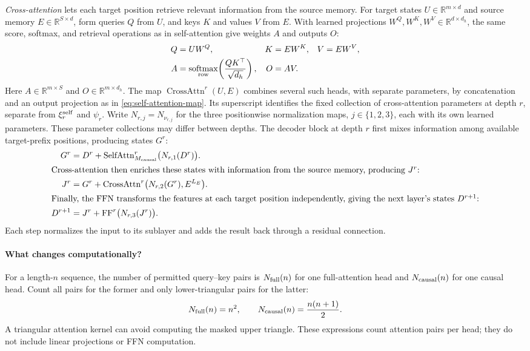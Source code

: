 \documentclass[11pt,twoside]{article}
\DeclareMathOperator{\softmax}{softmax}
\newcommand{\R}{\mathbb R}
\theoremstyle{plain}
\theoremstyle{definition}
\theoremstyle{remark}
\begin{document}
\emph{Cross-attention} lets each target position retrieve relevant information
from the source memory. For target states $U\in\R^{m\times d}$ and source
memory $E\in\R^{S\times d}$, form queries $Q$ from $U$, and keys $K$ and
values $V$ from $E$. With learned projections
$W^Q,W^K,W^V\in\R^{d\times d_h}$, the same score, softmax, and retrieval
operations as in self-attention give weights $A$ and outputs $O$:
\begin{equation}
\begin{aligned}
Q&=UW^Q,
&K&=EW^K,
&V&=EW^V,\\
A&=\softmax_{\rm row}\!\left(\frac{QK^\top}{\sqrt{d_h}}\right),
&O&=AV.
\end{aligned}
\label{eq:cross-attention-head}
\end{equation}
Here $A\in\R^{m\times S}$ and $O\in\R^{m\times d_h}$.
The map $\operatorname{CrossAttn}^r(U,E)$ combines several such heads,
with separate parameters, by concatenation and an output projection as in
\eqref{eq:self-attention-map}. Its superscript identifies the fixed collection
of cross-attention parameters at depth $r$, separate from $\xi^{\rm self}_r$
and $\psi_r$. Write $N_{r,j}=N_{\nu_{r,j}}$ for the three positionwise
normalization maps, $j\in\{1,2,3\}$, each with its own learned parameters.
These parameter collections may differ between depths.
The decoder block at depth $r$ first mixes information among available
target-prefix positions, producing states $G^r$:
\begin{align}
G^r
&=D^r+\operatorname{SelfAttn}^r_{M_{\rm causal}}
  \bigl(N_{r,1}(D^r)\bigr).
\nonumber\\
\intertext{Cross-attention then enriches these states with information from
the source memory, producing $J^r$:}
J^r
&=G^r+\operatorname{CrossAttn}^r
  \bigl(N_{r,2}(G^r),E^{L_E}\bigr).
\nonumber\\
\intertext{Finally, the FFN transforms the features at each target position
independently, giving the next layer's states $D^{r+1}$:}
D^{r+1}
&=J^r+\operatorname{FF}^r
  \bigl(N_{r,3}(J^r)\bigr).
\label{eq:encoder-decoder-block}
\end{align}
Each step normalizes the input to its sublayer and adds the result back
through a residual connection.

\paragraph{What changes computationally?}
For a length-$n$ sequence, the number of permitted query--key pairs is
$N_{\rm full}(n)$ for one full-attention head and $N_{\rm causal}(n)$ for
one causal head. Count all pairs for the former and only lower-triangular
pairs for the latter:
\begin{equation}
N_{\rm full}(n)=n^2,
\qquad
N_{\rm causal}(n)=\frac{n(n+1)}2.
\label{eq:full-causal-score-count}
\end{equation}
A triangular attention kernel can avoid computing the masked upper triangle.
These expressions count attention pairs per head; they do not include linear
projections or FFN computation.
\end{document}
